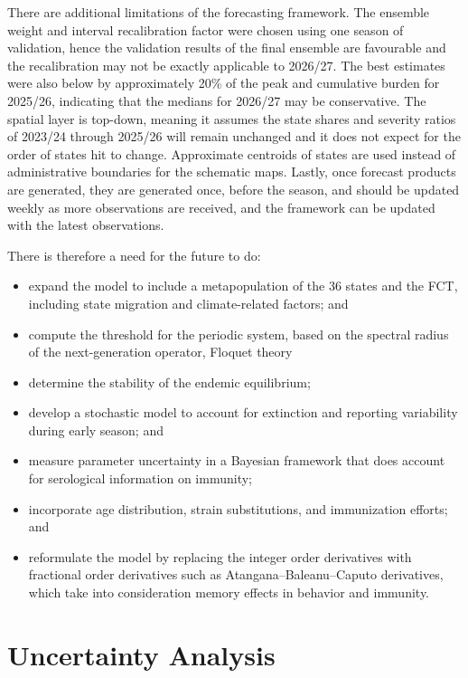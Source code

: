 \documentclass[12pt,a4paper]{article}
\theoremstyle{definition}
\theoremstyle{remark}
\begin{document}
There are additional limitations of the forecasting framework. The ensemble weight and interval recalibration factor were chosen using one season of validation, hence the validation results of the final ensemble are favourable and the recalibration may not be exactly applicable to 2026/27. The best estimates were also below by approximately 20\% of the peak and cumulative burden for 2025/26, indicating that the medians for 2026/27 may be conservative. The spatial layer is top-down, meaning it assumes the state shares and severity ratios of 2023/24 through 2025/26 will remain unchanged and it does not expect for the order of states hit to change. Approximate centroids of states are used instead of administrative boundaries for the schematic maps. Lastly, once forecast products are generated, they are generated once, before the season, and should be updated weekly as more observations are received, and the framework can be updated with the latest observations.

There is therefore a need for the future to do:
\begin{itemize}
\item expand the model to include a metapopulation of the 36 states and the FCT, including state migration and climate-related factors; and
\item compute the threshold for the periodic system, based on the spectral radius of the next-generation operator, Floquet theory
\item determine the stability of the endemic equilibrium;
\item develop a stochastic model to account for extinction and reporting variability during early season; and
\item measure parameter uncertainty in a Bayesian framework that does account for serological information on immunity;
\item incorporate age distribution, strain substitutions, and immunization efforts; and
\item reformulate the model by replacing the integer order derivatives with fractional order derivatives such as Atangana–Baleanu–Caputo derivatives, which take into consideration memory effects in behavior and immunity.
\end{itemize}

\section{Uncertainty Analysis}\label{sec:uncertainty}
\end{document}
